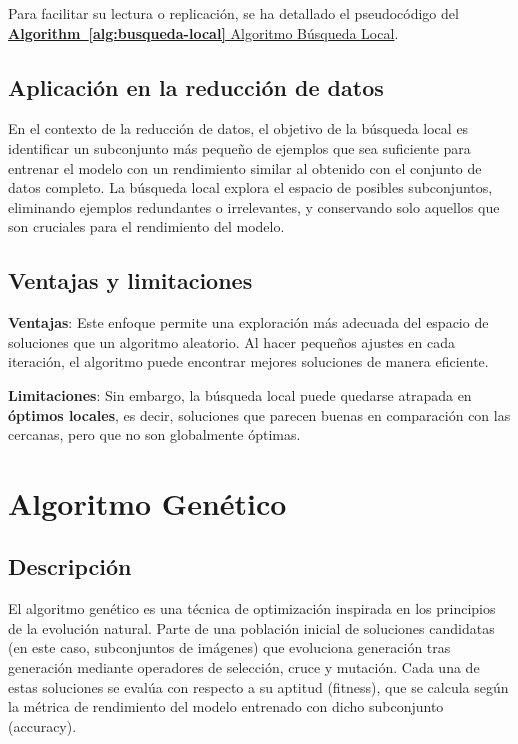 Para facilitar su lectura o replicación, se ha detallado el pseudocódigo del \hyperref[alg:busqueda-local]{\textbf{Algorithm~\ref*{alg:busqueda-local}} Algoritmo Búsqueda Local}.

\subsection{Aplicación en la reducción de datos}\label{subsec:aplicacion-en-la-reduccion-de-datos-busqueda-local}
En el contexto de la reducción de datos, el objetivo de la búsqueda local es identificar un subconjunto más pequeño de
ejemplos que sea suficiente para entrenar el modelo con un rendimiento similar al obtenido con el conjunto de datos
completo.
La búsqueda local explora el espacio de posibles subconjuntos, eliminando ejemplos redundantes o irrelevantes, y
conservando solo aquellos que son cruciales para el rendimiento del modelo.

\subsection{Ventajas y limitaciones}\label{subsec:ventajas-y-limitaciones-busqueda-local}
\textbf{Ventajas}: Este enfoque permite una exploración más adecuada del espacio de soluciones que un algoritmo
aleatorio.
Al hacer pequeños ajustes en cada iteración, el algoritmo puede encontrar mejores soluciones de manera eficiente.


\textbf{Limitaciones}: Sin embargo, la búsqueda local puede quedarse atrapada en \textbf{óptimos locales}, es decir,
soluciones que parecen buenas en comparación con las cercanas, pero que no son globalmente óptimas.

\section{Algoritmo Genético}\label{sec:genetico-v1}
\subsection{Descripción}\label{subsec:descripcion-genetico-v1}
El algoritmo genético es una técnica de optimización inspirada en los principios de la evolución natural.
Parte de una población inicial de soluciones candidatas (en este caso, subconjuntos de imágenes) que evoluciona generación
tras generación mediante operadores de selección, cruce y mutación.
Cada una de estas soluciones se evalúa con respecto a su aptitud (fitness), que se calcula según la métrica de rendimiento
del modelo entrenado con dicho subconjunto (accuracy).


